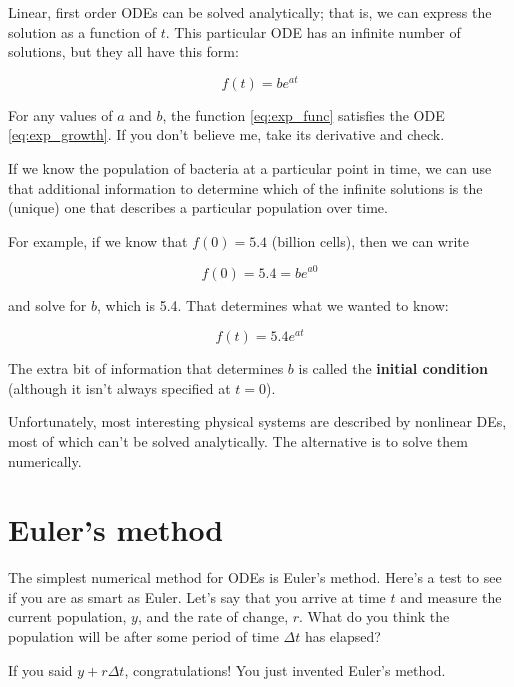 \documentclass[
]{book}
\begin{document}
Linear, first order ODEs can be solved analytically; that is, we
can express the solution as a function of $t$.
This particular ODE has an infinite number of solutions, but
they all have this form:

\begin{equation}\label{eq:exp_func}
f(t) = b e^{at}
\end{equation}


For any values of $a$ and $b$, the function \eqref{eq:exp_func} satisfies
the ODE \eqref{eq:exp_growth}.  If you don't believe me, take its
derivative and check.

If we know the population of bacteria at a particular point in time,
we can use that additional information to determine which of the
infinite solutions is the (unique) one that describes a particular
population over time.

For example, if we know that $f(0) = 5.4$ (billion cells), then we
can write

\begin{equation}
f(0) = 5.4 = b e^{a 0}
\end{equation}


and solve for $b$, which is 5.4.  That determines what we wanted
to know:

\begin{equation}
f(t) = 5.4 e^{at}
\end{equation}


The extra bit of information that determines $b$ is called
the {\bf initial condition} (although it isn't always specified
at $t=0$).

Unfortunately, most interesting physical systems are described by
nonlinear DEs, most of which can't be solved analytically.  The
alternative is to solve them numerically.


\section{Euler's method}

The simplest numerical method for ODEs is Euler's
method.  Here's a test to
see if you are as smart as Euler.  Let's say that you
arrive at time $t$ and measure the current population, $y$, and
the rate of change, $r$.  What do you think the population will
be after some period of time $\Delta t$ has elapsed?

If you said $y + r \Delta t$, congratulations!  You just invented
Euler's method.
\end{document}
